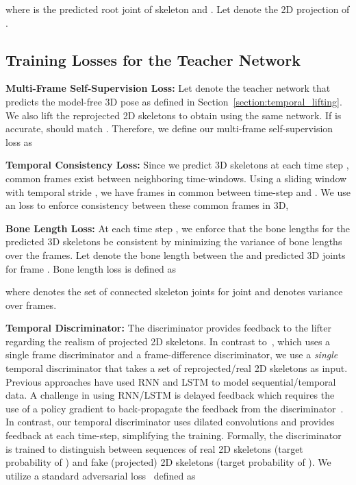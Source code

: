 \documentclass[10pt,twocolumn,letterpaper]{article}
\begin{document}
where  is the predicted root joint of  skeleton and . Let  denote the 2D projection of . 


\subsection{Training Losses for the Teacher Network}

\noindent\textbf{Multi-Frame Self-Supervision Loss:} Let  denote the teacher network that predicts the model-free 3D pose  as defined in Section~\ref{section:temporal_lifting}. We also lift the reprojected 2D skeletons to obtain  using the same network.
If  is accurate,  should match . Therefore, we define our multi-frame self-supervision loss as 
 


\noindent\textbf{Temporal Consistency Loss:} Since we predict  3D skeletons at each time step , common frames exist between neighboring time-windows. Using a sliding window with temporal stride , we have  frames in common between time-step  and . We use an  loss to enforce consistency between these common frames in 3D,


\noindent\textbf{Bone Length Loss:} At each time step , we enforce that the bone lengths for the  predicted 3D skeletons be consistent by minimizing the variance of bone lengths over the  frames. Let  denote the bone length between the  and  predicted 3D joints for frame . Bone length loss is defined as

where  denotes the set of connected skeleton joints for joint  and  denotes variance over  frames.


\noindent\textbf{Temporal Discriminator:} The discriminator provides feedback to the lifter regarding the realism of projected 2D skeletons. In contrast to~\cite{chingCVPR2019}, which uses a single frame discriminator and a frame-difference discriminator, we use a \textit{single} temporal discriminator that takes a set of  reprojected/real 2D skeletons as input. Previous approaches have used RNN and LSTM to model sequential/temporal data. A challenge in using RNN/LSTM is delayed feedback which requires the use of a policy gradient to back-propagate the feedback from the discriminator~\cite{DaiICCV2017ConditionalGAN}. In contrast, our temporal discriminator uses dilated convolutions and provides feedback at each time-step, simplifying the training. Formally, the discriminator is trained to distinguish between sequences of  real 2D skeletons  (target probability of ) and fake (projected) 2D skeletons  (target probability of ). We utilize a standard adversarial loss~\cite{GAN} defined as
\end{document}
